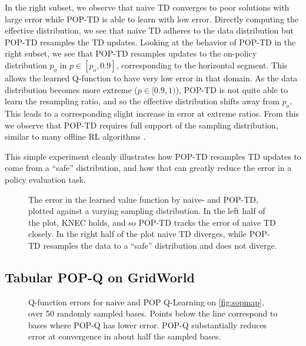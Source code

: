 In the right subset, we observe that naive TD converges to poor solutions with large error while POP-TD is able to learn with low error.
Directly computing the effective distribution, we see that naive TD adheres to the data distribution but POP-TD resamples the TD updates.
Looking at the behavior of POP-TD in the right subset, we see that POP-TD resamples updates to the on-policy distribution $p_o$ in $p\in[p_o,0.9]$, corresponding to the horizontal segment. This allows the learned Q-function to have very low error in that domain. As the data distribution becomes more extreme ($p\in [0.9, 1)$), POP-TD is not quite able to learn the resampling ratio, and so the effective distribution shifts away from $p_o$. This leads to a corresponding slight increase in error at extreme ratios. From this we observe that POP-TD requires full support of the sampling distribution, similar to many offline RL algorithms \cite{kumar2020cql,shi2022pessimistic}.

This simple experiment cleanly illustrates how POP-TD resamples TD updates to come from a ``safe'' distribution, and how that can greatly reduce the error in a policy evaluation task.

\label{sec:threestateexp}
\begin{figure}[t]
  \centering
  
  \caption{The error in the learned value function by naive- and POP-TD, plotted against a varying sampling distribution. In the left half of the plot, KNEC holds, and so POP-TD tracks the error of naive TD closely. In the right half of the plot naive TD diverges, while POP-TD resamples the data to a ``safe'' distribution and does not diverge. }
  \label{fig:threestate}
\end{figure}



\subsection{Tabular POP-Q on GridWorld}

\label{sec:expsimpleoffpolicy}
\begin{figure}[t]
  \centering
  
  \caption{Q-function errors for naive and POP Q-Learning on \cref{fig:sopmap}, over 50 randomly sampled bases. Points below the line correspond to bases where POP-Q has lower error. POP-Q substantially reduces error at convergence in about half the sampled bases. }
  \label{fig:soperr}
\end{figure}


